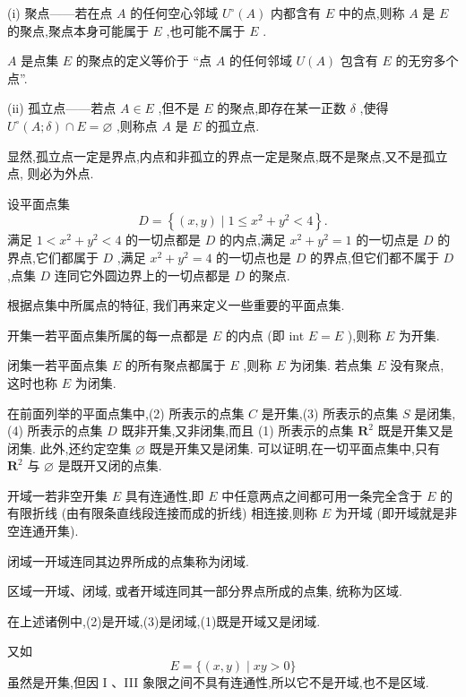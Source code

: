 (i) 聚点——若在点 \(A\) 的任何空心邻域 \({U}^{ \circ  }\left( A\right)\) 内都含有 \(E\) 中的点,则称 \(A\) 是 \(E\) 的聚点,聚点本身可能属于 \(E\) ,也可能不属于 \(E\) .

\(A\) 是点集 \(E\) 的聚点的定义等价于 “点 \(A\) 的任何邻域 \(U\left( A\right)\) 包含有 \(E\) 的无穷多个点”.

(ii) 孤立点——若点 \(A \in  E\) ,但不是 \(E\) 的聚点,即存在某一正数 \(\delta\) ,使得 \({U}^{ \circ  }\left( {A;\delta }\right)  \cap  E = \varnothing\) ,则称点 \(A\) 是 \(E\) 的孤立点.

显然,孤立点一定是界点,内点和非孤立的界点一定是聚点,既不是聚点,又不是孤立点, 则必为外点.

\begin{example}

\end{example}
设平面点集
\[
D = \left\{  {\left( {x,y}\right)  \mid  1 \leq  {x}^{2} + {y}^{2} < 4}\right\}  . \tag{4}
\]
满足 \(1 < {x}^{2} + {y}^{2} < 4\) 的一切点都是 \(D\) 的内点,满足 \({x}^{2} + {y}^{2} = 1\) 的一切点是 \(D\) 的界点,它们都属于 \(D\) ,满足 \({x}^{2} + {y}^{2} = 4\) 的一切点也是 \(D\) 的界点,但它们都不属于 \(D\) ,点集 \(D\) 连同它外圆边界上的一切点都是 \(D\) 的聚点.

根据点集中所属点的特征, 我们再来定义一些重要的平面点集.

开集一若平面点集所属的每一点都是 \(E\) 的内点 (即 int \(E = E\) ),则称 \(E\) 为开集.

闭集一若平面点集 \(E\) 的所有聚点都属于 \(E\) ,则称 \(E\) 为闭集. 若点集 \(E\) 没有聚点, 这时也称 \(E\) 为闭集.

在前面列举的平面点集中,(2) 所表示的点集 \(C\) 是开集,(3) 所表示的点集 \(S\) 是闭集,(4) 所表示的点集 \(D\) 既非开集,又非闭集,而且 (1) 所表示的点集 \({\mathbf{R}}^{2}\) 既是开集又是闭集. 此外,还约定空集 \(\varnothing\) 既是开集又是闭集. 可以证明,在一切平面点集中,只有 \({\mathbf{R}}^{2}\) 与 \(\varnothing\) 是既开又闭的点集.

开域一若非空开集 \(E\) 具有连通性,即 \(E\) 中任意两点之间都可用一条完全含于 \(E\) 的有限折线 (由有限条直线段连接而成的折线) 相连接,则称 \(E\) 为开域 (即开域就是非空连通开集).

闭域一开域连同其边界所成的点集称为闭域.

区域一开域、闭域, 或者开域连同其一部分界点所成的点集, 统称为区域.

在上述诸例中,(2)是开域,(3)是闭域,(1)既是开域又是闭域.

又如
\[
E = \{ \left( {x,y}\right)  \mid  {xy} > 0\}  \tag{5}
\]
虽然是开集,但因 I 、III 象限之间不具有连通性,所以它不是开域,也不是区域.

